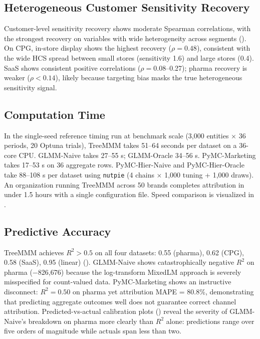 \documentclass[review,12pt]{elsarticle}
\begin{document}
\subsection{Heterogeneous Customer Sensitivity Recovery}
\label{sec:results:hcs}

Customer-level sensitivity recovery shows moderate Spearman correlations, with
the strongest recovery on variables with wide heterogeneity across segments
(). On CPG, in-store display shows the highest recovery
($\rho = 0.48$), consistent with the wide HCS spread between small stores
(sensitivity 1.6) and large stores (0.4). SaaS shows consistent positive
correlations ($\rho = 0.08$--0.27); pharma recovery is weaker ($\rho < 0.14$),
likely because targeting bias masks the true heterogeneous sensitivity signal.

\subsection{Computation Time}
\label{sec:results:speed}

In the single-seed reference timing run at benchmark scale (3,000 entities
$\times$ 36 periods, 20 Optuna trials),
TreeMMM takes 51--64 seconds per dataset on a 36-core CPU. GLMM-Naive takes
27--55 s; GLMM-Oracle 34--56 s. PyMC-Marketing takes 17--53 s on 36 aggregate
rows. PyMC-Hier-Naive and PyMC-Hier-Oracle take 88--108 s per dataset using
\texttt{nutpie} (4 chains $\times$ 1,000 tuning + 1,000 draws). An organization
running TreeMMM across 50 brands completes attribution in under 1.5 hours with
a single configuration file. Speed comparison is visualized in
.

\subsection{Predictive Accuracy}
\label{sec:results:predictive}

TreeMMM achieves $R^2 > 0.5$ on all four datasets: 0.55 (pharma), 0.62 (CPG),
0.58 (SaaS), 0.95 (linear) (). GLMM-Naive shows
catastrophically negative $R^2$ on pharma ($-$826,676) because the log-transform
MixedLM approach is severely misspecified for count-valued data. PyMC-Marketing shows an instructive
disconnect: $R^2 = 0.50$ on pharma yet attribution MAPE = 80.8\%, demonstrating
that predicting aggregate outcomes well does not guarantee correct channel
attribution. Predicted-vs-actual calibration plots ()
reveal the severity of GLMM-Naive's breakdown on pharma more clearly than $R^2$
alone: predictions range over five orders of magnitude while actuals span less
than two.
\end{document}
